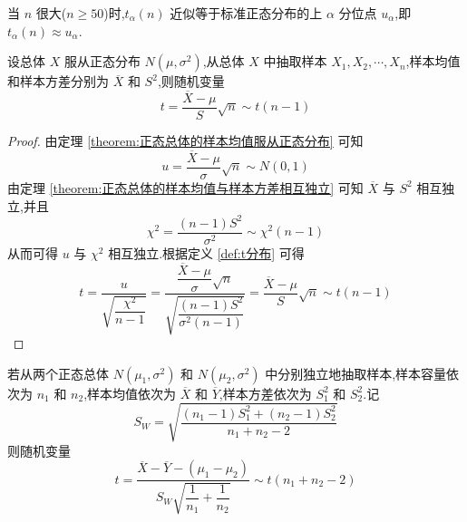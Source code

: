 当 $n$ 很大($n \geqslant 50$)时,$t_{\alpha}(n)$ 近似等于标准正态分布的上 $\alpha$ 分位点 $u_{\alpha}$,即 $t_{\alpha}(n) \approx u_{\alpha}$.

\begin{theorem}
    设总体 $X$ 服从正态分布 $N(\mu,\sigma^2)$,从总体 $X$ 中抽取样本 $X_1,X_2,\cdots,X_n$,样本均值和样本方差分别为 $\overline{X}$ 和 $S^2$,则随机变量
    $$
    t = \dfrac{\overline{X} - \mu}{S} \sqrt{n} \sim t(n-1)
    $$
\end{theorem}

\begin{proof}
    由定理 \ref{theorem:正态总体的样本均值服从正态分布} 可知
    $$
    u = \dfrac{\overline{X} - \mu}{\sigma} \sqrt{n} \sim N(0,1)
    $$
    由定理 \ref{theorem:正态总体的样本均值与样本方差相互独立} 可知 $\overline{X}$ 与 $S^2$ 相互独立,并且
    $$
    \chi^2 = \dfrac{(n-1) S^2}{\sigma^2} \sim \chi^2(n-1)
    $$
    从而可得 $u$ 与 $\chi^2$ 相互独立.根据定义 \ref{def:t分布} 可得
    $$
    t = \dfrac{u}{\sqrt{\dfrac{\chi^2}{n-1}}} = \dfrac{\dfrac{\overline{X} - \mu}{\sigma} \sqrt{n}}{\sqrt{\dfrac{(n-1) S^2}{\sigma^2 (n-1)}}} = \dfrac{\overline{X} - \mu}{S} \sqrt{n} \sim t(n-1)
    $$
\end{proof}

\begin{theorem}
    若从两个正态总体 $N(\mu_1, \sigma^2)$ 和 $N(\mu_2, \sigma^2)$ 中分别独立地抽取样本,样本容量依次为 $n_1$ 和 $n_2$,样本均值依次为 $\overline{X}$ 和 $\overline{Y}$,样本方差依次为 $S_1^2$ 和 $S_2^2$.记
    $$
    S_W = \sqrt{\dfrac{(n_1 - 1) S_1^2 + (n_2 - 1) S_2^2}{n_1 + n_2 - 2}}
    $$
    则随机变量
    $$
    t = \dfrac{\overline{X} - \overline{Y} - (\mu_1 - \mu_2)}{S_W \sqrt{\dfrac{1}{n_1} + \dfrac{1}{n_2}}} \sim t(n_1 + n_2 - 2)
    $$
\end{theorem}

